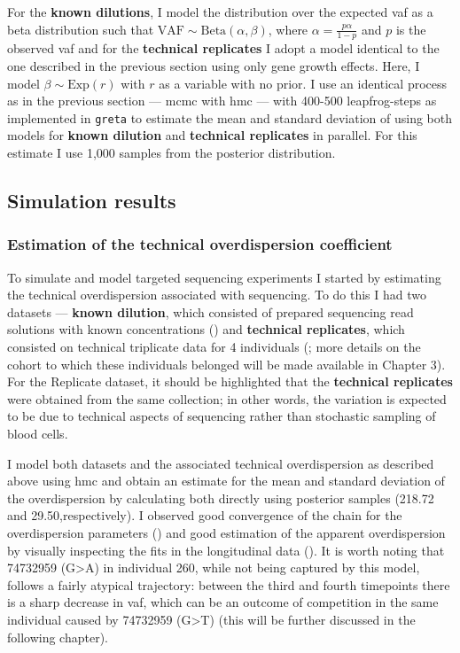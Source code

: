For the \textbf{known dilutions}, I model the distribution over the expected \ac{vaf} as a beta distribution such that $\mathrm{VAF} \sim \mathrm{Beta}(\alpha,\beta)$, where $\alpha=\frac{p\alpha}{1-p}$ and $p$ is the observed \ac{vaf} and for the \textbf{technical replicates} I adopt a model identical to the one described in the previous section using only gene growth effects. Here, I model $\beta \sim \mathrm{Exp}(r)$ with $r$ as a variable with no prior. I use an identical process as in the previous section --- \ac{mcmc} with \ac{hmc} --- with 400-500 leapfrog-steps as implemented in \texttt{greta} \cite{Golding2019-wh} to estimate the mean and standard deviation of using both models for \textbf{known dilution} and \textbf{technical replicates} in parallel. For this estimate I use 1,000 samples from the posterior distribution.

\subsection{Simulation results}

\subsubsection{Estimation of the technical overdispersion coefficient}

To simulate and model targeted sequencing experiments I started by estimating the technical overdispersion associated with sequencing. To do this I had two datasets --- \textbf{known dilution}, which consisted of prepared sequencing read solutions with known concentrations () and \textbf{technical replicates}, which consisted on technical triplicate data for 4 individuals (; more details on the cohort to which these individuals belonged will be made available in Chapter 3). For the Replicate dataset, it should be highlighted that the \textbf{technical replicates} were obtained from the same collection; in other words, the variation is expected to be due to technical aspects of sequencing rather than stochastic sampling of blood cells. 

I model both datasets and the associated technical overdispersion as described above using \ac{hmc} and obtain an estimate for the mean and standard deviation of the overdispersion by calculating both directly using posterior samples (218.72 and 29.50,respectively). I observed good convergence of the chain for the overdispersion parameters () and good estimation of the apparent overdispersion by visually inspecting the fits in the longitudinal data (). It is worth noting that 74732959 (G>A) in individual 260, while not being captured by this model, follows a fairly atypical trajectory: between the third and fourth timepoints there is a sharp decrease in \ac{vaf}, which can be an outcome of competition in the same individual caused by 74732959 (G>T) (this will be further discussed in the following chapter).

